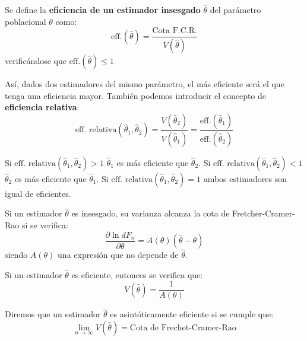 \begin{definicion}
Se define la \textbf{eficiencia de un estimador insesgado} $\hat{\theta}$ del par\'ametro poblacional $\theta$ como:
\begin{equation*}
\textrm{eff.}(\hat{\theta})=\dfrac{\textrm{Cota F.C.R.}}{V(\hat{\theta})}
\end{equation*}
verific\'andose que $\textrm{eff.}(\hat{\theta})\leq 1$
\end{definicion}
As\'i, dados dos estimadores del mismo par\'ametro, el m\'as eficiente ser\'a el que tenga una eficiencia mayor. Tambi\'en podemos introducir el concepto de \textbf{eficiencia relativa}:
\begin{equation*}
\textrm{eff. relativa}(\hat{\theta}_1,\hat{\theta}_2)=\dfrac{V(\hat{\theta}_2)}{V(\hat{\theta}_1)}=\dfrac{\textrm{eff.}(\hat{\theta}_1)}{\textrm{eff.}(\hat{\theta}_2)}
\end{equation*}

Si $\textrm{eff. relativa}(\hat{\theta}_1,\hat{\theta}_2)>1$ $\hat{\theta}_1$ es m\'as eficiente que $\hat{\theta}_2$. Si $\textrm{eff. relativa}(\hat{\theta}_1,\hat{\theta}_2)<1$ $\hat{\theta}_2$ es m\'as eficiente que $\hat{\theta}_1$. Si $\textrm{eff. relativa}(\hat{\theta}_1,\hat{\theta}_2)=1$ ambos estimadores son igual de eficientes.

\begin{teorema}
Si un estimador $\hat{\theta}$ es insesgado, su varianza alcanza la cota de Fretcher-Cramer-Rao si se verifica:
\begin{equation*}
\dfrac{\partial\ln{dF_n}}{\partial\theta}=A(\theta)(\hat{\theta}-\theta)
\end{equation*}
siendo $A(\theta)$ una expresi\'on que no depende de $\hat{\theta}$.
\end{teorema}


\begin{teorema}
Si un estimador $\hat{\theta}$ es eficiente, entonces se verifica que:
\begin{equation*}
V(\hat{\theta})=\dfrac{1}{A(\theta)}
\end{equation*}
\end{teorema}

\begin{definicion}
Diremos que un estimador $\hat{\theta}$ es asint\'oticamente eficiente si se cumple que:
\begin{equation*}
\lim_{n\to\infty}{V(\hat{\theta})}=\textrm{Cota de Frechet-Cramer-Rao}
\end{equation*}
\end{definicion}

